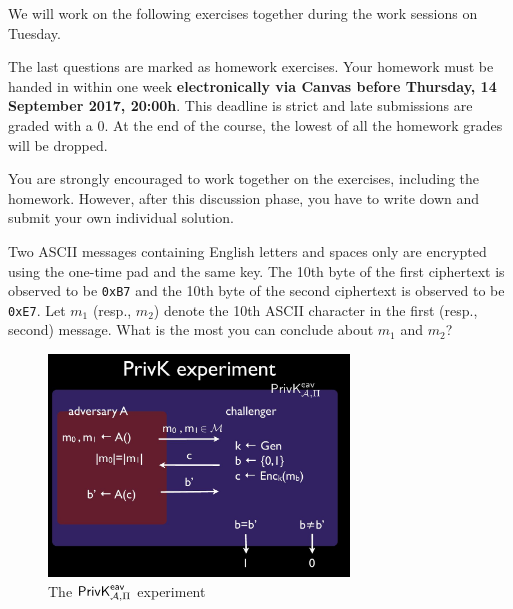\documentclass[a4paper,10pt,landscape,twocolumn]{scrartcl}
\newcommand\deadline{Thursday, 14 September 2017, 20:00h}
\begin{document}
\problems

{\sffamily\noindent
We will work on the following exercises together during the work sessions on Tuesday. 

The last questions are marked as homework exercises. 
Your homework must be handed in within one week \textbf{electronically via Canvas before \deadline}. This deadline is strict and late submissions are graded with a 0. At the end of the course, the lowest of all the homework grades will be dropped. 

You are strongly encouraged to work together on the exercises, including the homework. However, after this discussion phase, you have to write down and submit your own individual solution. }

\begin{exercise}
Two ASCII messages containing English letters and spaces only are encrypted using the one-time pad and the same key. The 10th byte of the first ciphertext is observed to be \texttt{0xB7} and the 10th byte of the second ciphertext is observed to be \texttt{0xE7}. Let $m_1$ (resp., $m_2$) denote the 10th ASCII character in the first (resp., second) message. What is the most you can conclude about $m_1$ and $m_2$?
\end{exercise}

\begin{figure}[h]
\center
\includegraphics[width=8cm]{PrivKexperiment.jpg}
\caption{The $\mathsf{PrivK}^{\mathsf{eav}}_{\mathcal{A},\Pi}$ experiment \label{fig}}
\end{figure}
\end{document}
